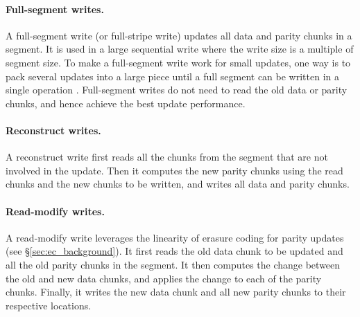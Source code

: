 
\paragraph{Full-segment writes.} A full-segment write (or full-stripe write)
updates all data and parity chunks in a segment. 
It is used in a large sequential
write where the write size is a multiple of segment size.  To make a
full-segment write work for small updates, one way is to pack several updates
into a large piece until a full segment can be written in a single operation 
\cite{menon95}. Full-segment writes do not need to read the old data or parity
chunks, and hence achieve the best update performance.


\paragraph{Reconstruct writes.} A reconstruct write first reads all the chunks
from the segment that are not involved in the update.  Then it computes the new parity chunks
using the read chunks and the new chunks to be written, and writes all data
and parity chunks. 

\paragraph{Read-modify writes.} A read-modify write leverages the linearity of
erasure coding for parity updates (see \S\ref{sec:ec_background}).  It first
reads the old data chunk to be updated and all the old parity chunks in the
segment.  It then computes the change between the old and new data chunks, and
applies the change to each of the parity chunks. 
Finally, it writes the new data chunk and all new parity chunks to their
respective locations. 

